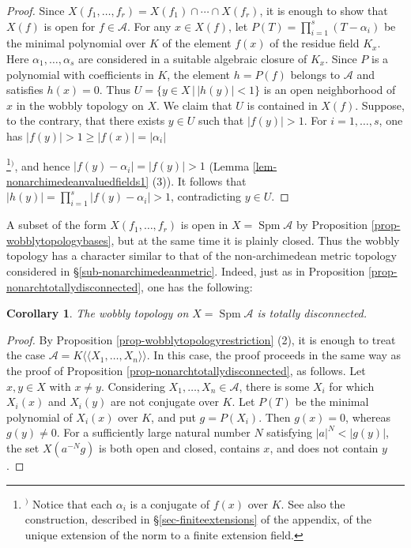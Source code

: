 \documentclass[a4paper,12pt, dvipdfmx]{jsbook}
\def\Spm{\mathop{\mathrm{Spm}}\nolimits}
\def\dl{\langle\!\langle}
\def\dr{\rangle\!\rangle}
\newcommand{\abs}[1]{\lvert#1\rvert}
\theoremstyle{plain}
\newtheorem{cor}[thm]{\bfseries Corollary}
\theoremstyle{definition}
\newcounter{chushaku}
\def\chu#1{\addtocounter{chushaku}{1}\footnote[\value{chushaku}]{${}^)$ #1}${}^)$}
\begin{document}
\begin{proof}[Proof]
Since $X(f_1,\ldots,f_r)=X(f_1)\cap\cdots\cap X(f_r)$, it is enough to show that $X(f)$ is open for $f\in\mathcal{A}$.
For any $x\in X(f)$, let $P(T)=\prod^s_{i=1}(T-\alpha_i)$ be the minimal polynomial over $K$ of the element $f(x)$ of the residue field $K_x$.
Here $\alpha_1,\ldots,\alpha_s$ are considered in a suitable algebraic closure of $K_x$.
Since $P$ is a polynomial with coefficients in $K$, the element $h=P(f)$ belongs to $\mathcal{A}$ and satisfies $h(x)=0$.
Thus $U=\{y\in X\,|\,\abs{h(y)}<1\}$ is an open neighborhood of $x$ in the wobbly topology on $X$.
We claim that $U$ is contained in $X(f)$.
Suppose, to the contrary, that there exists $y\in U$ such that $\abs{f(y)}>1$.
For $i=1,\ldots,s$, one has $\abs{f(y)}>1\geq\abs{f(x)}=\abs{\alpha_i}$\chu{Notice that each $\alpha_i$ is a conjugate of $f(x)$ over $K$. See also the construction, described in \S\ref{sec-finiteextensions} of the appendix, of the unique extension of the norm to a finite extension field.}, and hence $\abs{f(y)-\alpha_i}=\abs{f(y)}>1$ (Lemma \ref{lem-nonarchimedeanvaluedfields1} (3)).
It follows that $\abs{h(y)}=\prod^s_{i=1}\abs{f(y)-\alpha_i}>1$, contradicting $y\in U$.
\end{proof}

A subset of the form $X(f_1,\ldots,f_r)$ is open in $X=\Spm\mathcal{A}$ by Proposition \ref{prop-wobblytopologybases}, but at the same time it is plainly closed.
Thus the wobbly topology has a character similar to that of the non-archimedean metric topology considered in \S\ref{sub-nonarchimedeanmetric}.
Indeed, just as in Proposition \ref{prop-nonarchtotallydisconnected}, one has the following:
\begin{cor}\label{cor-wobblytopologyrestriction}{\rm 
The wobbly topology on $X=\Spm\mathcal{A}$ is totally disconnected.}
\end{cor}

\begin{proof}[Proof]
By Proposition \ref{prop-wobblytopologyrestriction} (2), it is enough to treat the case $\mathcal{A}=K\dl X_1,\ldots,X_n\dr$.
In this case, the proof proceeds in the same way as the proof of Proposition \ref{prop-nonarchtotallydisconnected}, as follows.
Let $x,y\in X$ with $x\neq y$.
Considering $X_1,\ldots,X_n\in\mathcal{A}$, there is some $X_i$ for which $X_i(x)$ and $X_i(y)$ are not conjugate over $K$.
Let $P(T)$ be the minimal polynomial of $X_i(x)$ over $K$, and put $g=P(X_i)$. Then $g(x)=0$, whereas $g(y)\neq 0$.
For a sufficiently large natural number $N$ satisfying $\abs{a}^N<\abs{g(y)}$, the set $X(a^{-N}g)$ is both open and closed, contains $x$, and does not contain $y$.
\end{proof}
\end{document}
